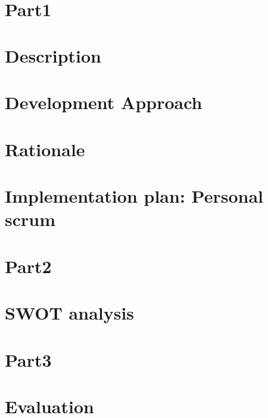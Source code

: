 \begin{align}
	
\end{align}



 
  \section*{Part1}
  \section*{Description}
  
  \section*{Development Approach}
  
  \section*{Rationale}
  
  \section*{Implementation plan: Personal scrum}
  


  \section*{Part2}
  \section*{SWOT analysis}
  
  

  \section*{Part3}
  \section*{Evaluation}
  
  

